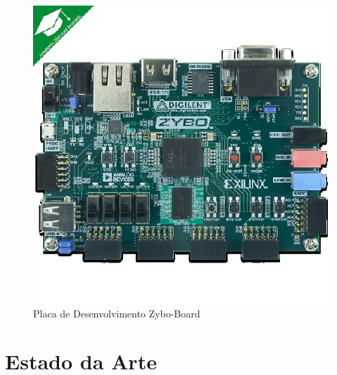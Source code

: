 \begin{figure}[h]
	\centering
	\includegraphics[keepaspectratio=true,scale=1.0]{figuras/zyboboard.eps}
	\caption{Placa de Desenvolvimento Zybo-Board}
	\label{Zybo Board}
\end{figure}



\section{Estado da Arte}




